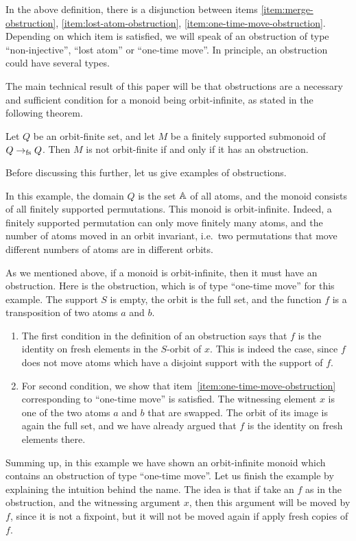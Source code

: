 In the above definition, there is a disjunction between items \ref{item:merge-obstruction}, \ref{item:lost-atom-obstruction}, \ref{item:one-time-move-obstruction}. Depending on which item is satisfied, we will speak of an obstruction of type ``non-injective'', ``lost atom'' or ``one-time move''. In principle, an obstruction could have several types.

The main technical result of this paper will be that obstructions are a necessary and sufficient condition for a monoid being orbit-infinite, as stated in the following theorem. 


\begin{theorem}\label{thm:obstructions-sound-and-complete}
    Let $Q$ be an orbit-finite set, and let $M$ be a finitely supported submonoid of $Q \to_{\text{fs}} Q$.
    Then $M$ is not orbit-finite if and only if it has an obstruction.
\end{theorem}

 Before discussing this further, let us give examples  of obstructions.
 

\begin{myexample} In this example, the domain $Q$ is the set $\mathbb A$ of all atoms, and the monoid consists of all finitely supported permutations. This monoid is orbit-infinite. Indeed, 
a finitely supported permutation can only move finitely many atoms, and the number of atoms moved in an orbit invariant, i.e.~two permutations that move different numbers of atoms are in different orbits.

As we mentioned above, if a monoid is orbit-infinite, then it must have an obstruction. Here is the obstruction, which is of type ``one-time move'' for this example. The support $S$ is empty, the orbit is the full set,  and the function $f$ is a transposition of two atoms $a$ and $b$.
\begin{enumerate}
    \item   The first condition in the definition of an obstruction says  that $f$ is the identity on fresh elements in the $S$-orbit of $x$.  This is indeed the case, since $f$ does not move atoms which have a disjoint support with the support of $f$.
    \item  For second condition, we show that item~\ref{item:one-time-move-obstruction} corresponding to ``one-time move'' is satisfied. The witnessing element $x$ is one of the two atoms $a$ and $b$ that are swapped. The orbit of its image is again the full set,  and we have already argued that $f$ is the identity on fresh elements there.  
\end{enumerate}
Summing up, in this example we have shown an orbit-infinite monoid which contains an obstruction of type ``one-time move''. Let us finish the example by explaining the intuition behind the name. The idea is that if take an $f$ as in the obstruction, and the witnessing argument $x$, then this argument will be moved by $f$, since it is not a fixpoint, but it will not be moved again if apply fresh copies of $f$. 
\end{myexample}


